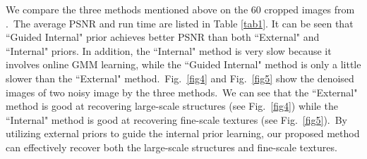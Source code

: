 \documentclass[10pt,twocolumn,letterpaper]{article}
\begin{document}
We compare the three methods mentioned above on the 60 cropped images from \cite{crosschannel2016}.\ The average PSNR and run time  are listed in Table \ref{tab1}. It can be seen that ``Guided Internal" prior achieves better PSNR than both ``External" and ``Internal" priors. In addition, the ``Internal" method is very slow because it involves online GMM learning, while the ``Guided Internal" method is only a little slower than the ``External" method.\ Fig.\ \ref{fig4} and Fig.\ \ref{fig5} show the denoised images of two noisy image by the three methods.\ We can see that the ``External" method is good at recovering large-scale structures (see Fig.\ \ref{fig4}) while the ``Internal" method is good at recovering fine-scale textures (see Fig.\ \ref{fig5}).\ By utilizing external priors to guide the internal prior learning, our proposed method can effectively recover both the large-scale structures and fine-scale textures. 
\end{document}
